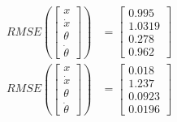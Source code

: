 \documentclass[11pt, reqno, letterpaper, twoside]{amsart}
\theoremstyle{plain}
\theoremstyle{definition}
\begin{document}
\begin{equation}
    \begin{split}
        RMSE \left(\begin{bmatrix}
            x \\
            \dot{x} \\
            \theta \\
            \dot{\theta}
        \end{bmatrix}\right) &= \begin{bmatrix}
            0.995 \\
            1.0319 \\
            0.278 \\
            0.962
        \end{bmatrix} \\
        RMSE \left(\begin{bmatrix}
            x \\
            \dot{x} \\
            \theta \\
            \dot{\theta}
        \end{bmatrix}\right) &= \begin{bmatrix}
            0.018 \\
            1.237 \\
            0.0923 \\
            0.0196
        \end{bmatrix}
    \end{split}
\end{equation}
\end{document}
